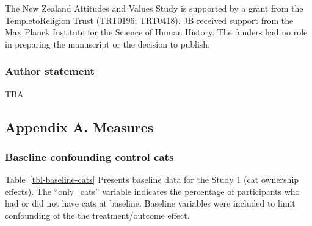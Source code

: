 \documentclass[
  singlecolumn,
  9pt]{article}
\begin{document}
The New Zealand Attitudes and Values Study is supported by a grant from
the TempletoReligion Trust (TRT0196; TRT0418). JB received support from
the Max Planck Institute for the Science of Human History. The funders
had no role in preparing the manuscript or the decision to publish.

\subsubsection{Author statement}\label{author-statement}

TBA

\newpage{}

\subsection{Appendix A. Measures}\label{appendix-a.-measures}

\subsubsection{Baseline confounding control
cats}\label{baseline-confounding-control-cats}

Table~\ref{tbl-baseline-cats} Presents baseline data for the Study 1
(cat ownership effects). The ``only\_cats'' variable indicates the
percentage of participants who had or did not have cats at baseline.
Baseline variables were included to limit confounding of the the
treatment/outcome effect.
\end{document}
